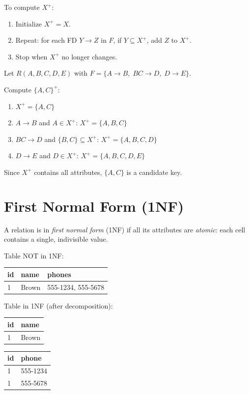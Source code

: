 \begin{proposition}
To compute $X^+$:
\begin{enumerate}
    \item Initialize $X^+ = X$.
    \item Repeat: for each FD $Y \to Z$ in $F$, if $Y \subseteq X^+$,
          add $Z$ to $X^+$.
    \item Stop when $X^+$ no longer changes.
\end{enumerate}
\end{proposition}

\begin{example}
Let $R(A, B, C, D, E)$ with $F = \{A \to B, \; BC \to D, \; D \to E\}$.

Compute $\{A, C\}^+$:
\begin{enumerate}
    \item $X^+ = \{A, C\}$
    \item $A \to B$ and $A \in X^+$: $X^+ = \{A, B, C\}$
    \item $BC \to D$ and $\{B,C\} \subseteq X^+$: $X^+ = \{A, B, C, D\}$
    \item $D \to E$ and $D \in X^+$: $X^+ = \{A, B, C, D, E\}$
\end{enumerate}
Since $X^+$ contains all attributes, $\{A, C\}$ is a candidate key.
\end{example}

\section{First Normal Form (1NF)}

\begin{definition}[1NF]
A relation is in \emph{first normal form} (1NF) if all its attributes are
\emph{atomic}: each cell contains a single, indivisible value.
\end{definition}

\begin{example}
Table NOT in 1NF:
\begin{center}
\begin{tabular}{lll}
\toprule
id & name & phones \\
\midrule
1 & Brown & 555-1234, 555-5678 \\
\bottomrule
\end{tabular}
\end{center}

Table in 1NF (after decomposition):
\begin{center}
\begin{tabular}{ll}
\toprule
id & name \\
\midrule
1 & Brown \\
\bottomrule
\end{tabular}
\qquad
\begin{tabular}{ll}
\toprule
id & phone \\
\midrule
1 & 555-1234 \\
1 & 555-5678 \\
\bottomrule
\end{tabular}
\end{center}
\end{example}


